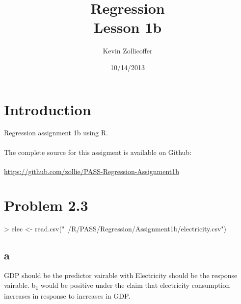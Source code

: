 \documentclass{article}
\author{Kevin Zollicoffer}
\title{Regression\\Lesson 1b}
\date{10/14/2013}
\begin{document}
\maketitle


\section*{Introduction}
Regression assignment 1b using R. 
\\
\\
The complete source for this assigment is available on Github:
\\
\\
\url{https://github.com/zollie/PASS-Regression-Assignment1b}

\section*{Problem 2.3}
\begin{Schunk}
\begin{Sinput}
> elec <- read.csv("~/R/PASS/Regression/Assignment1b/electricity.csv")
\end{Sinput}
\end{Schunk}

\subsection*{a}
GDP should be the predictor vairable with Electricity should be the response vairable. b\textsubscript{1} would be positive under the claim that electricity consumption increases in response to increases in GDP.
\end{document}
